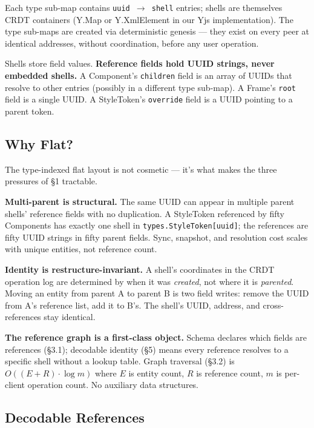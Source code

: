 Each type sub-map contains \texttt{uuid $\rightarrow$ shell} entries; shells are themselves CRDT containers (Y.Map or Y.XmlElement in our Yjs implementation). The type sub-maps are created via deterministic genesis\cite{plexus:genesis} --- they exist on every peer at identical addresses, without coordination, before any user operation.

Shells store field values. \textbf{Reference fields hold UUID strings, never embedded shells.} A Component's \texttt{children} field is an array of UUIDs that resolve to other entries (possibly in a different type sub-map). A Frame's \texttt{root} field is a single UUID. A StyleToken's \texttt{override} field is a UUID pointing to a parent token.

\subsection{Why Flat?}

The type-indexed flat layout is not cosmetic --- it's what makes the three pressures of \S1 tractable.

\textbf{Multi-parent is structural.} The same UUID can appear in multiple parent shells' reference fields with no duplication. A StyleToken referenced by fifty Components has exactly one shell in \texttt{types.StyleToken[uuid]}; the references are fifty UUID strings in fifty parent fields. Sync, snapshot, and resolution cost scales with unique entities, not reference count.

\textbf{Identity is restructure-invariant.} A shell's coordinates in the CRDT operation log are determined by when it was \emph{created}, not where it is \emph{parented}. Moving an entity from parent A to parent B is two field writes: remove the UUID from A's reference list, add it to B's. The shell's UUID, address, and cross-references stay identical.

\textbf{The reference graph is a first-class object.} Schema declares which fields are references (\S3.1); decodable identity (\S5) means every reference resolves to a specific shell without a lookup table. Graph traversal (\S3.2) is $O((E + R) \cdot \log m)$ where $E$ is entity count, $R$ is reference count, $m$ is per-client operation count. No auxiliary data structures.

\subsection{Decodable References}

